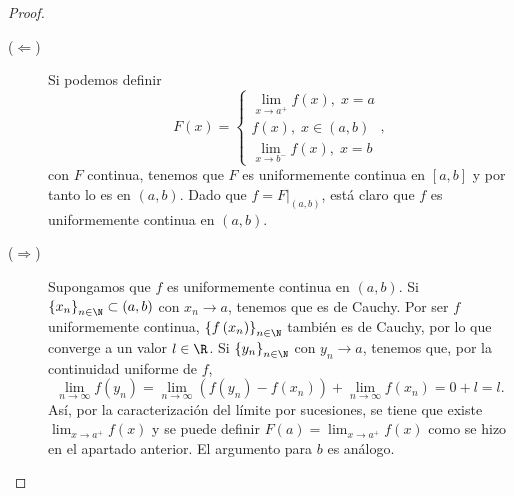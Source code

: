 \begin{proof}
\begin{description}
\item[ ($\Leftarrow $) ] Si podemos definir
	\[ F\left(x\right) = 
	\begin{cases}
	\lim_{x \to a^{+}}f\left(x\right), \; x = a \\
	f\left(x\right), \; x \in \left(a,b\right) \\
	\lim_{x \to b^{-}}f\left(x\right), \; x = b
	\end{cases},\]
	con $\displaystyle F $ continua, tenemos que $\displaystyle F $ es uniformemente continua en $\displaystyle \left[a,b\right]  $ y por tanto lo es en $\displaystyle \left(a,b\right) $. Dado que $\displaystyle f = F|_{\left(a,b\right)} $, está claro que $\displaystyle f $ es uniformemente continua en $\displaystyle \left(a,b\right) $.
\item[ ($\displaystyle \Rightarrow $) ] Supongamos que $\displaystyle f $ es uniformemente continua en $\displaystyle \left(a,b\right) $. Si $\displaystyle \left\{ x_{n}\right\} _{n\in\N} \subset \left(a,b\right) $ con $\displaystyle x_{n} \to a $, tenemos que es de Cauchy. Por ser $\displaystyle f $ uniformemente continua, $\displaystyle \left\{ f\left(x_{n}\right)\right\} _{n\in\N}$ también es de Cauchy, por lo que converge a un valor $\displaystyle l \in \R $. 
	Si $\displaystyle \left\{ y_{n}\right\} _{n\in \N} $ con $\displaystyle y_{n} \to a $, tenemos que, por la continuidad uniforme de $\displaystyle f $,
	\[\lim_{n \to \infty}f\left(y_{n}\right) = \lim_{n \to \infty}\left(f\left(y_{n}\right)-f\left(x_{n}\right)\right)+\lim_{n \to \infty}f\left(x_{n}\right)= 0 + l = l .\]
	Así, por la caracterización del límite por sucesiones, se tiene que existe $\displaystyle \lim_{x \to a^{+}}f\left(x\right) $ y se puede definir $\displaystyle F\left(a\right) = \lim_{x \to a^{+}} f\left(x\right)$ como se hizo en el apartado anterior. El argumento para $\displaystyle b $ es análogo.
\end{description}
\end{proof}
